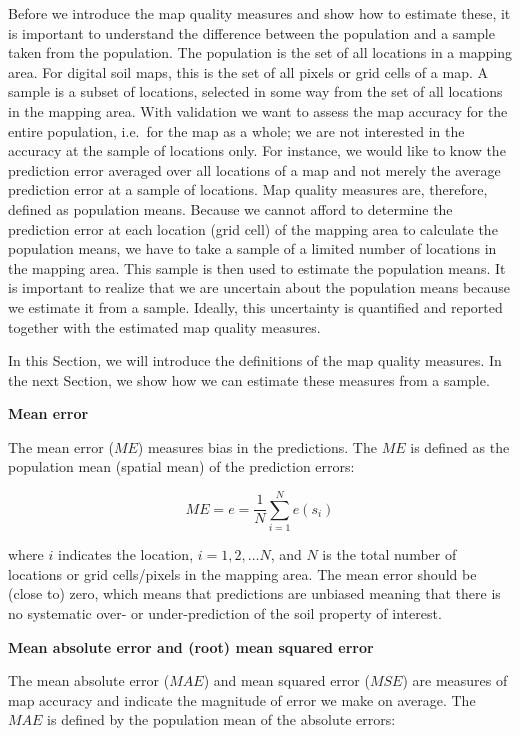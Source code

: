 \documentclass[10pt,b5paper,]{book}
\theoremstyle{definition}
\theoremstyle{definition}
\theoremstyle{definition}
\theoremstyle{remark}
\begin{document}
Before we introduce the map quality measures and show how to estimate
these, it is important to understand the difference between the
population and a sample taken from the population. The population is the
set of all locations in a mapping area. For digital soil maps, this is
the set of all pixels or grid cells of a map. A sample is a subset of
locations, selected in some way from the set of all locations in the
mapping area. With validation we want to assess the map accuracy for the
entire population, i.e.~for the map as a whole; we are not interested in
the accuracy at the sample of locations only. For instance, we would
like to know the prediction error averaged over all locations of a map
and not merely the average prediction error at a sample of locations.
Map quality measures are, therefore, defined as population means.
Because we cannot afford to determine the prediction error at each
location (grid cell) of the mapping area to calculate the population
means, we have to take a sample of a limited number of locations in the
mapping area. This sample is then used to estimate the population means.
It is important to realize that we are uncertain about the population
means because we estimate it from a sample. Ideally, this uncertainty is
quantified and reported together with the estimated map quality
measures.

In this Section, we will introduce the definitions of the map quality
measures. In the next Section, we show how we can estimate these
measures from a sample.

\textbf{Mean error}

The mean error (\({ME}\)) measures bias in the predictions. The \({ME}\)
is defined as the population mean (spatial mean) of the prediction
errors:

\begin{equation}
M E = e = \frac{1}{N} \sum_{i=1}^{N} e (s_i)
\end{equation}

where \(i\) indicates the location, \({i = 1, 2,\dots N}\), and \(N\) is
the total number of locations or grid cells/pixels in the mapping area.
The mean error should be (close to) zero, which means that predictions
are unbiased meaning that there is no systematic over- or
under-prediction of the soil property of interest.

\textbf{Mean absolute error and (root) mean squared error}

The mean absolute error (\({MAE}\)) and mean squared error (\({MSE}\))
are measures of map accuracy and indicate the magnitude of error we make
on average. The \({MAE}\) is defined by the population mean of the
absolute errors:
\end{document}
